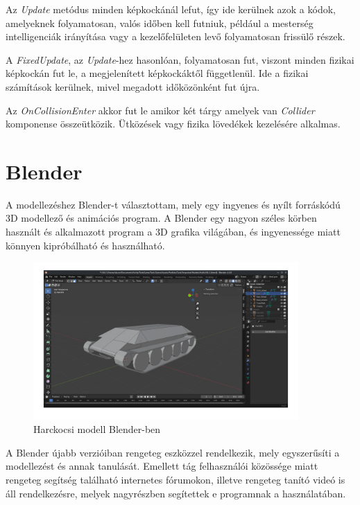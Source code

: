 \documentclass[
]{thesis-ekf}
\theoremstyle{definition}
\theoremstyle{remark}
\begin{document}
Az \emph{Update} metódus minden képkockánál lefut, így ide kerülnek azok a kódok, amelyeknek folyamatosan, valós időben kell futniuk, például a mesterség intelligenciák irányítása vagy a kezelőfelületen levő folyamatosan frissülő részek.

A \emph{FixedUpdate}, az \emph{Update}-hez hasonlóan, folyamatosan fut, viszont minden fizikai képkockán fut le, a megjelenített képkockáktől függetlenül. Ide a fizikai számítások kerülnek, mivel megadott időközönként fut újra.

Az \emph{OnCollisionEnter} akkor fut le amikor két tárgy amelyek van \emph{Collider} komponense összeütközik. Ütközések vagy fizika lövedékek kezelésére alkalmas.


\section{Blender}

A modellezéshez Blender-t választottam, mely egy ingyenes és nyílt forráskódú 3D modellező és animációs program. A Blender egy nagyon széles körben használt és alkalmazott program a 3D grafika világában, és ingyenessége miatt könnyen kipróbálható és használható.

\begin{figure}[H]
    \centering
    \includegraphics[width=0.9\textwidth]{screenshots/blender.png}
    \caption{Harckocsi modell Blender-ben}
    \label{fig:blender}
\end{figure}

A Blender újabb verzióiban rengeteg eszközzel rendelkezik, mely egyszerűsíti a modellezést és annak tanulását. Emellett tág felhasználói közössége miatt rengeteg segítség található internetes fórumokon, illetve rengeteg tanító videó is áll rendelkezésre, melyek nagyrészben segítettek e programnak a használatában.
\end{document}
